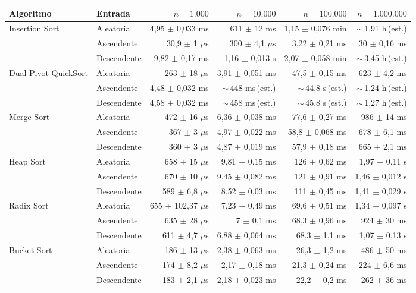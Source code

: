 {\scriptsize
\begin{tabular}{llrrrr}
\toprule
Algoritmo & Entrada & $n=1.000$ & $n=10.000$ & $n=100.000$ & $n=1.000.000$ \\
\midrule
Insertion Sort & Aleatoria & 4,95 $\pm$ 0,033 ms & 611 $\pm$ 12 ms & 1,15 $\pm$ 0,076 min & $\sim$\,1,91 h\,(est.) \\
 & Ascendente & 30,9 $\pm$ 1 $\mu$s & 300 $\pm$ 4,1 $\mu$s & 3,22 $\pm$ 0,21 ms & 30 $\pm$ 0,16 ms \\
 & Descendente & 9,82 $\pm$ 0,17 ms & 1,16 $\pm$ 0,013 s & 2,07 $\pm$ 0,058 min & $\sim$\,3,45 h\,(est.) \\
Dual-Pivot QuickSort & Aleatoria & 263 $\pm$ 18 $\mu$s & 3,91 $\pm$ 0,051 ms & 47,5 $\pm$ 0,15 ms & 623 $\pm$ 4,2 ms \\
 & Ascendente & 4,48 $\pm$ 0,032 ms & $\sim$\,448 ms\,(est.) & $\sim$\,44,8 s\,(est.) & $\sim$\,1,24 h\,(est.) \\
 & Descendente & 4,58 $\pm$ 0,032 ms & $\sim$\,458 ms\,(est.) & $\sim$\,45,8 s\,(est.) & $\sim$\,1,27 h\,(est.) \\
Merge Sort & Aleatoria & 472 $\pm$ 16 $\mu$s & 6,36 $\pm$ 0,038 ms & 77,6 $\pm$ 0,27 ms & 986 $\pm$ 14 ms \\
 & Ascendente & 367 $\pm$ 3 $\mu$s & 4,97 $\pm$ 0,022 ms & 58,8 $\pm$ 0,068 ms & 678 $\pm$ 6,1 ms \\
 & Descendente & 360 $\pm$ 3 $\mu$s & 4,87 $\pm$ 0,019 ms & 57,9 $\pm$ 0,18 ms & 665 $\pm$ 2,1 ms \\
Heap Sort & Aleatoria & 658 $\pm$ 15 $\mu$s & 9,81 $\pm$ 0,15 ms & 126 $\pm$ 0,62 ms & 1,97 $\pm$ 0,11 s \\
 & Ascendente & 670 $\pm$ 10 $\mu$s & 9,45 $\pm$ 0,082 ms & 121 $\pm$ 0,91 ms & 1,46 $\pm$ 0,012 s \\
 & Descendente & 589 $\pm$ 6,8 $\mu$s & 8,52 $\pm$ 0,03 ms & 111 $\pm$ 0,45 ms & 1,41 $\pm$ 0,029 s \\
Radix Sort & Aleatoria & 655 $\pm$ 102,37 $\mu$s & 7,23 $\pm$ 0,49 ms & 69,6 $\pm$ 0,51 ms & 1,34 $\pm$ 0,097 s \\
 & Ascendente & 635 $\pm$ 28 $\mu$s & 7 $\pm$ 0,1 ms & 68,3 $\pm$ 0,96 ms & 924 $\pm$ 30 ms \\
 & Descendente & 611 $\pm$ 4,7 $\mu$s & 6,88 $\pm$ 0,064 ms & 68,3 $\pm$ 1,1 ms & 1,07 $\pm$ 0,13 s \\
Bucket Sort & Aleatoria & 186 $\pm$ 13 $\mu$s & 2,38 $\pm$ 0,063 ms & 26,3 $\pm$ 1,2 ms & 486 $\pm$ 50 ms \\
 & Ascendente & 174 $\pm$ 8,2 $\mu$s & 2,17 $\pm$ 0,18 ms & 21,3 $\pm$ 0,24 ms & 224 $\pm$ 6,6 ms \\
 & Descendente & 183 $\pm$ 2,1 $\mu$s & 2,18 $\pm$ 0,023 ms & 22,2 $\pm$ 0,2 ms & 262 $\pm$ 36 ms \\
\bottomrule
\end{tabular}}\par

